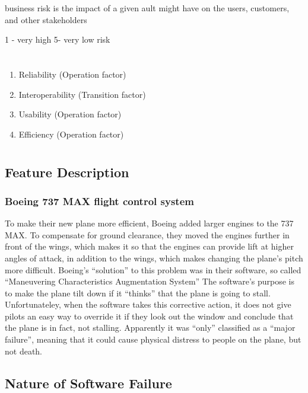 \documentclass[letterpaper]{article}
\begin{document}
business risk is the impact of a given ault might have on the users,
customers, and other stakeholders

1 - very high 5- very low risk

\section{}

\begin{enumerate}
	\item Reliability (Operation factor)
	\item Interoperability (Transition factor)
	\item Usability (Operation factor)
	\item Efficiency (Operation factor)
\end{enumerate}

\section{}


\subsection*{Feature Description}
\subsubsection*{Boeing 737 MAX flight control system}
To make their new plane more efficient, Boeing added larger engines to the 737 MAX.
To compensate for ground clearance, they moved the engines further in front of the wings,
which makes it so that the engines can provide lift at higher angles of attack, in addition to the wings, which makes
changing the plane's pitch more difficult. Boeing's ``solution'' to this problem was in their software,
so called “Maneuvering Characteristics Augmentation System”\cite{ieeespectrum}
The software's purpose is to make the plane tilt down if it ``thinks'' that the plane is going to stall.
Unfortunateley, when the software takes this corrective action, it does not give pilots an easy way to override it if
they look out the window and conclude that the plane is in fact, not stalling.
Apparently it was ``only'' classified as a ``major failure'', meaning that it could cause physical distress to people on the plane, but not death.\cite{gates_2019}

\subsection*{Nature of Software Failure}
\end{document}
